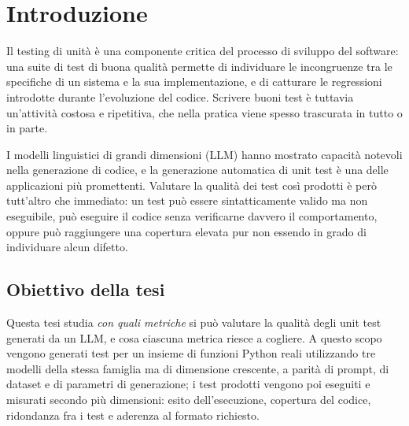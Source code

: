 \chapter{Introduzione}
\label{ch:introduzione}




Il testing di unità è una componente critica del processo di sviluppo del
software: una suite di test di buona qualità permette di individuare le
incongruenze tra le specifiche di un sistema e la sua implementazione, e di
catturare le regressioni introdotte durante l'evoluzione del codice. Scrivere
buoni test è tuttavia un'attività costosa e ripetitiva, che nella pratica viene
spesso trascurata in tutto o in parte.

I modelli linguistici di grandi dimensioni (LLM) hanno mostrato capacità
notevoli nella generazione di codice, e la generazione automatica di unit test
è una delle applicazioni più promettenti. Valutare la qualità dei test così
prodotti è però tutt'altro che immediato: un test può essere sintatticamente
valido ma non eseguibile, può eseguire il codice senza verificarne davvero il
comportamento, oppure può raggiungere una copertura elevata pur non essendo in
grado di individuare alcun difetto.

\section{Obiettivo della tesi}

Questa tesi studia \emph{con quali metriche} si può valutare la qualità degli
unit test generati da un LLM, e cosa ciascuna metrica riesce a cogliere. A
questo scopo vengono generati test per un insieme di funzioni Python reali
utilizzando tre modelli della stessa famiglia ma di dimensione crescente, a
parità di prompt, di dataset e di parametri di generazione; i test prodotti
vengono poi eseguiti e misurati secondo più dimensioni: esito dell'esecuzione,
copertura del codice, ridondanza fra i test e aderenza al formato richiesto.

